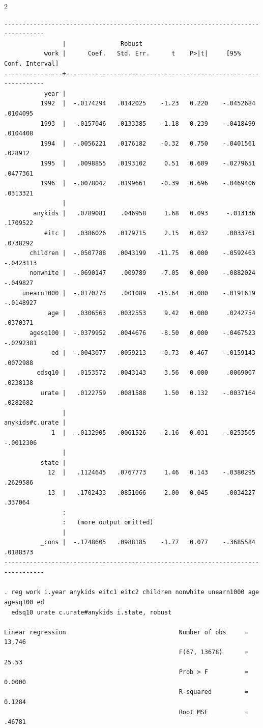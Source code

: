 \documentclass{article}
\newenvironment{changemargin}[2]{%
\begin{list}{}{%
\setlength{\topsep}{0pt}%
\setlength{\leftmargin}{#1}%
\setlength{\rightmargin}{#2}%
\setlength{\listparindent}{\parindent}%
\setlength{\itemindent}{\parindent}%
\setlength{\parsep}{\parskip}%
}%
\item[]}{\end{list}}
\begin{document}
\begin{changemargin}{-0.5in}{-0.5in}
\begin{multicols}{2}
\begin{verbatim}
---------------------------------------------------------------------------------
                |               Robust
           work |      Coef.   Std. Err.      t    P>|t|     [95% Conf. Interval]
----------------+----------------------------------------------------------------
           year |
          1992  |  -.0174294   .0142025    -1.23   0.220    -.0452684    .0104095
          1993  |  -.0157046   .0133385    -1.18   0.239    -.0418499    .0104408
          1994  |  -.0056221   .0176182    -0.32   0.750    -.0401561     .028912
          1995  |   .0098855   .0193102     0.51   0.609    -.0279651    .0477361
          1996  |  -.0078042   .0199661    -0.39   0.696    -.0469406    .0313321
                |
        anykids |   .0789081    .046958     1.68   0.093     -.013136    .1709522
           eitc |   .0386026   .0179715     2.15   0.032     .0033761    .0738292
       children |  -.0507788   .0043199   -11.75   0.000    -.0592463   -.0423113
       nonwhite |  -.0690147    .009789    -7.05   0.000    -.0882024    -.049827
     unearn1000 |  -.0170273    .001089   -15.64   0.000    -.0191619   -.0148927
            age |   .0306563   .0032553     9.42   0.000     .0242754    .0370371
       agesq100 |  -.0379952   .0044676    -8.50   0.000    -.0467523   -.0292381
             ed |  -.0043077   .0059213    -0.73   0.467    -.0159143    .0072988
         edsq10 |   .0153572   .0043143     3.56   0.000     .0069007    .0238138
          urate |   .0122759   .0081588     1.50   0.132    -.0037164    .0282682
                |
anykids#c.urate |
             1  |  -.0132905   .0061526    -2.16   0.031    -.0253505   -.0012306
                |
          state |
            12  |   .1124645   .0767773     1.46   0.143    -.0380295    .2629586
            13  |   .1702433   .0851066     2.00   0.045     .0034227     .337064
                :
                :   (more output omitted)
                |
          _cons |  -.1748605   .0988185    -1.77   0.077    -.3685584    .0188373
---------------------------------------------------------------------------------

. reg work i.year anykids eitc1 eitc2 children nonwhite unearn1000 age agesq100 ed 
  edsq10 urate c.urate#anykids i.state, robust

Linear regression                               Number of obs     =     13,746
                                                F(67, 13678)      =      25.53
                                                Prob > F          =     0.0000
                                                R-squared         =     0.1284
                                                Root MSE          =     .46781


\end{verbatim}
\end{multicols}
\end{changemargin}
\end{document}
